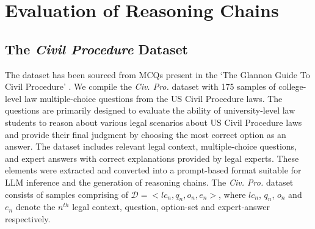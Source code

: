 
\section{Evaluation of Reasoning Chains}
\label{sec:error_category}

\subsection{The \textit{Civil Procedure} Dataset}
The dataset has been sourced from MCQs present in the `The Glannon Guide To Civil Procedure' \citep{glannon2013guide}. We compile the \textit{Civ. Pro.} dataset with 175 samples of college-level law multiple-choice questions from the US Civil Procedure laws. The questions are primarily designed to evaluate the ability of university-level law students to reason about various legal scenarios about US Civil Procedure laws and provide their final judgment by choosing the most correct option as an answer. The dataset includes relevant legal context, multiple-choice questions, and expert answers with correct explanations provided by legal experts. These elements were extracted and converted into a prompt-based format suitable for LLM inference and the generation of reasoning chains. The \textit{Civ. Pro.} dataset consists of samples comprising of $\mathcal{D} = {<lc_{n}, q_{n}, o_{n}, e_{n}>}$, where $lc_n$, $q_{n}$, $o_{n}$ and $e_{n}$ denote the $n^{th}$ legal context, question, option-set and expert-answer respectively.  


 
